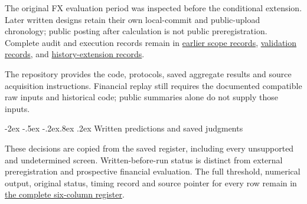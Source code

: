 \documentclass[12pt,a4paper]{article}
\makeatletter
\renewcommand\section{\@startsection{section}{1}{\z@}%
  {-2ex \@plus -.5ex \@minus -.2ex}{.8ex \@plus .2ex}%
  {\normalfont\large\bfseries}}
\makeatother
\begin{document}
The original FX evaluation period was inspected before the conditional extension. Later written designs retain their own local-commit and public-upload chronology; public posting after calculation is not public preregistration. Complete audit and execution records remain in \href{https://github.com/ByronLi0207/financial-mathematics-paper-20261020/blob/submission-final/EXTENDED_RESULTS.md#asmbi-extended-s36}{earlier scope records}, \href{https://github.com/ByronLi0207/financial-mathematics-paper-20261020/blob/submission-final/EXTENDED_RESULTS.md#asmbi-extended-s38}{validation records}, and \href{https://github.com/ByronLi0207/financial-mathematics-paper-20261020/blob/submission-final/EXTENDED_RESULTS.md#asmbi-extended-s39}{history-extension records}.

The repository provides the code, protocols, saved aggregate results and source acquisition instructions. Financial replay still requires the documented compatible raw inputs and historical code; public summaries alone do not supply those inputs.

\FloatBarrier


\section{Written predictions and saved judgments}\label{sup:submission-predictions}

These decisions are copied from the saved register, including every unsupported and undetermined screen. Written-before-run status is distinct from external preregistration and prospective financial evaluation. The full threshold, numerical output, original status, timing record and source pointer for every row remain in \href{https://github.com/ByronLi0207/financial-mathematics-paper-20261020/blob/submission-final/EXTENDED_RESULTS.md#asmbi-extended-s40}{the complete six-column register}.
\end{document}
